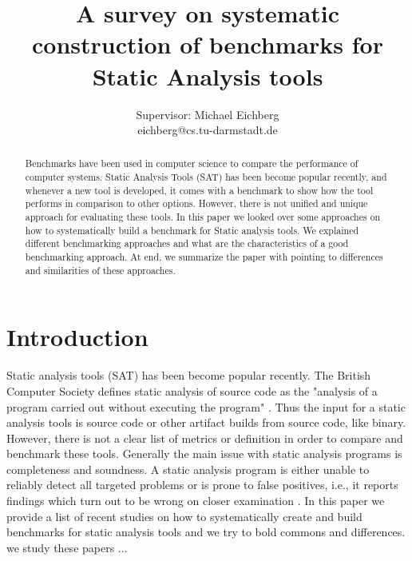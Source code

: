 \documentclass[authoryear,preprint]{sigplanconf}
\begin{document}
	
	\setlength{\pdfpageheight}{\paperheight}
	\setlength{\pdfpagewidth}{\paperwidth}
	
	
	\title{A survey on systematic construction of benchmarks for Static Analysis tools}
	\subtitle{Supervisor: Michael Eichberg \\ eichberg@cs.tu-darmstadt.de}
	
	
	\maketitle


\begin{abstract}
	Benchmarks have been used in computer science to compare the performance of computer systems. Static Analysis Tools (SAT) has been become popular recently, and whenever a new tool is developed, it comes with a benchmark to show how the tool performs in comparison to other options. However, there is not unified and unique approach for evaluating these tools. In this paper we looked over some approaches on how to systematically build a benchmark for Static analysis tools. We explained different benchmarking approaches and what are the characteristics of a good benchmarking approach. At end, we summarize the paper with pointing to differences and similarities of these approaches.
\end{abstract}

\section{Introduction}
\label{sec:introduction}
Static analysis tools (SAT) has been become popular recently. The British Computer Society defines static analysis of source code as the "analysis of a program carried out without executing the program" \cite{Glossary_of_term}. Thus the input for a static analysis tools is source code or other artifact builds from source code, like binary. However, there is not a clear list of metrics or definition in order to compare and benchmark these tools. Generally the main issue with static analysis programs is completeness and soundness. A static analysis program is either unable to reliably detect all targeted problems or is prone to false positives, i.e., it reports findings which turn out to be wrong on closer examination \cite{Scanstud}. In this paper we provide a list of recent studies on how to systematically create and build benchmarks for static analysis tools and we try to bold commons and differences. we study these papers ... 
\end{document}
